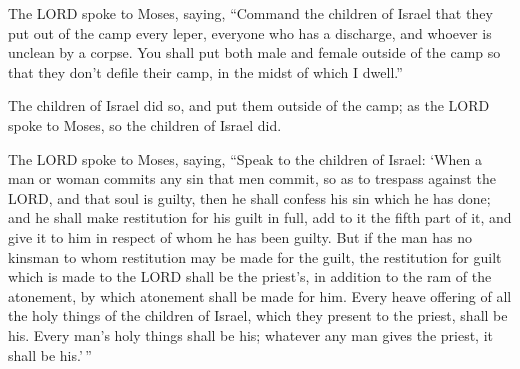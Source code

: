  The LORD spoke to Moses, saying,  ``Command the
children of Israel that they put out of the camp every leper, everyone
who has a discharge, and whoever is unclean by a corpse. 
You shall put both male and female outside of the camp so that they
don't defile their camp, in the midst of which I dwell.''

 The children of Israel did so, and put them outside of the
camp; as the LORD spoke to Moses, so the children of Israel did.

 The LORD spoke to Moses, saying,  ``Speak to
the children of Israel: `When a man or woman commits any sin that men
commit, so as to trespass against the LORD, and that soul is guilty,
 then he shall confess his sin which he has done; and he
shall make restitution for his guilt in full, add to it the fifth part
of it, and give it to him in respect of whom he has been guilty.
 But if the man has no kinsman to whom restitution may be
made for the guilt, the restitution for guilt which is made to the LORD
shall be the priest's, in addition to the ram of the atonement, by which
atonement shall be made for him.  Every heave offering of
all the holy things of the children of Israel, which they present to the
priest, shall be his.  Every man's holy things shall be
his; whatever any man gives the priest, it shall be his.'\,''

